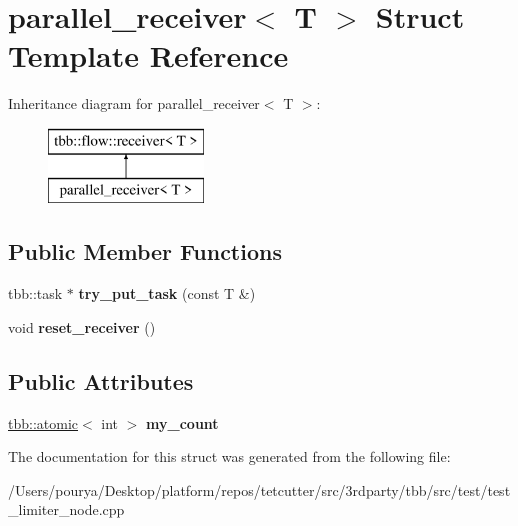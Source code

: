 \hypertarget{structparallel__receiver}{}\section{parallel\+\_\+receiver$<$ T $>$ Struct Template Reference}
\label{structparallel__receiver}
Inheritance diagram for parallel\+\_\+receiver$<$ T $>$\+:\begin{figure}[H]
\begin{center}
\leavevmode
\includegraphics[height=2.000000cm]{structparallel__receiver}
\end{center}
\end{figure}
\subsection*{Public Member Functions}
\begin{DoxyCompactItemize}
\item 
\hypertarget{structparallel__receiver_aa5f61cf30ec4517068a8caa7d9372f57}{}tbb\+::task $\ast$ {\bfseries try\+\_\+put\+\_\+task} (const T \&)\label{structparallel__receiver_aa5f61cf30ec4517068a8caa7d9372f57}

\item 
\hypertarget{structparallel__receiver_a0e45a013f7032aba51f82424648ed2aa}{}void {\bfseries reset\+\_\+receiver} ()\label{structparallel__receiver_a0e45a013f7032aba51f82424648ed2aa}

\end{DoxyCompactItemize}
\subsection*{Public Attributes}
\begin{DoxyCompactItemize}
\item 
\hypertarget{structparallel__receiver_ac9eaa6240d9aa97cab41f0e022920a6e}{}\hyperlink{structtbb_1_1atomic}{tbb\+::atomic}$<$ int $>$ {\bfseries my\+\_\+count}\label{structparallel__receiver_ac9eaa6240d9aa97cab41f0e022920a6e}

\end{DoxyCompactItemize}


The documentation for this struct was generated from the following file\+:\begin{DoxyCompactItemize}
\item 
/\+Users/pourya/\+Desktop/platform/repos/tetcutter/src/3rdparty/tbb/src/test/test\+\_\+limiter\+\_\+node.\+cpp\end{DoxyCompactItemize}

